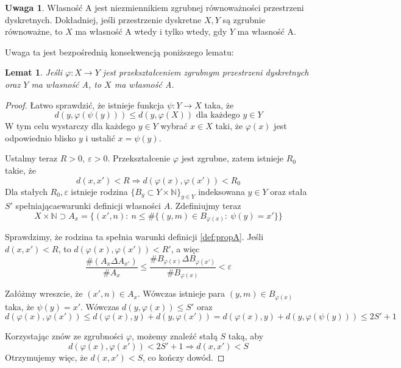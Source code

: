 \documentclass[licencjacka]{pracamgr}
\theoremstyle{definition}
\theoremstyle{definition}
\newtheorem{remark}{Uwaga}[section]
\theoremstyle{definition}
\theoremstyle{definition}
\theoremstyle{definition}
\theoremstyle{plain}
\newtheorem{lemma}{Lemat}[section]
\theoremstyle{plain}
\begin{document}
\begin{remark}
	Własność A jest niezmiennikiem zgrubnej równoważności przestrzeni dyskretnych. 
	Dokładniej, jeśli przestrzenie dyskretne $ X,Y $ są zgrubnie równoważne, to 
	$ X $ ma własność A wtedy i tylko wtedy, gdy $ Y $ ma własność A.
\end{remark}

Uwaga ta jest bezpośrednią konsekwencją poniższego lematu:

\begin{lemma}
	Jeśli $ \varphi: X \rightarrow Y $ jest przekształceniem zgrubnym przestrzeni dyskretnych 
	oraz $ Y $ ma własność A, to $ X $ ma własność A.
\end{lemma}
\begin{proof}
	Łatwo sprawdzić, że istnieje funkcja $\psi: Y \rightarrow X $ taka, że
	$$ d(y, \varphi(\psi(y)))  \leq d(y,  \varphi(X)) \text{ dla każdego } y \in Y$$
	W tym celu wystarczy dla każdego $ y \in Y $ wybrać $ x \in X $ taki, że 
	$ \varphi(x) $ jest odpowiednio blisko $ y $ i ustalić $ x = \psi(y) $.

	Ustalmy teraz $ R > 0,~  \varepsilon > 0 $. Przekształcenie $\varphi$ jest zgrubne, zatem 
	istnieje $ R_0 $ takie, że $$ d(x,x') < R \Rightarrow d(\varphi(x), \varphi(x')) < R_0 $$ 
	Dla stałych $ R_0, \varepsilon $ istnieje rodzina 
	$ \{B_y \subset Y \times \mathbb{N}\}_{y \in Y} $ 
	indeksowana $ y \in Y $ oraz stała $S'$ spełniającaewarunki definicji własności $ A $.
 	 Zdefiniujmy 
	teraz 
	$$ X \times \mathbb{N} \supset A_x = \{(x', n): ~ n \leq \# \{ (y,m) \in B_{\varphi(x)} : ~
	\psi(y) = x' \}\} $$

	Sprawdzimy, że rodzina ta spełnia warunki definicji \ref{def:propA}. Jeśli 
	$ d(x,x') < R $, to $ d(\varphi(x), \varphi(x')) < R' $, a więc 
	$$ \frac{\# (A_x \Delta A_{x'})}{\# A_x} \leq \frac{\# B_{\varphi(x)} \Delta 
	B_{\varphi(x')}}{\# B_{\varphi(x)}} < \varepsilon $$

	Załóżmy wreszcie, że $ (x', n) \in A_x $. Wówczas istnieje para $ (y,m) \in 
	B_{\varphi(x)} $ taka, że $ \psi(y) = x' $. Wówczas $d(y,\varphi(x)) \leq S'$ oraz 
	$$ d(\varphi(x), \varphi(x')) \leq d(\varphi(x),y) + d(y,\varphi(x')) = d(\varphi(x),y) + 
	d(y, \varphi(\psi(y))) \leq 2S' + 1 $$

	Korzystając znów ze zgrubności $\varphi$, możemy znaleźć stałą $ S $ taką, aby 
	$$ d(\varphi(x), \varphi(x')) < 2S' +1 \Rightarrow d(x,x') < S $$
	Otrzymujemy więc, że $ d(x,x') < S $, co kończy dowód.
\end{proof}
\end{document}
